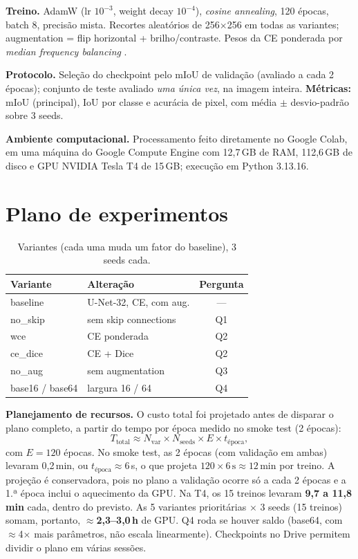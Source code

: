 \documentclass[10pt,a4paper,twocolumn]{article}
\begin{document}
\textbf{Treino.} AdamW (lr $10^{-3}$, weight decay $10^{-4}$), \emph{cosine annealing},
120 épocas, batch 8, precisão mista. Recortes aleatórios de 256$\times$256 em todas as
variantes; augmentation = flip horizontal + brilho/contraste. Pesos da CE ponderada por
\emph{median frequency balancing} \cite{eigen}.

\textbf{Protocolo.} Seleção do checkpoint pelo mIoU de validação (avaliado a cada 2
épocas); conjunto de teste avaliado \emph{uma única vez}, na imagem inteira.
\textbf{Métricas:} mIoU (principal), IoU por classe e acurácia de pixel, com
média $\pm$ desvio-padrão sobre 3 seeds.

\textbf{Ambiente computacional.} Processamento feito diretamente no Google Colab,
em uma máquina do Google Compute Engine com 12,7\,GB de RAM, 112,6\,GB de disco e
GPU NVIDIA Tesla T4 de 15\,GB; execução em Python 3.13.16.

\section{Plano de experimentos}
\begin{table}[h]
\centering\small
\caption{Variantes (cada uma muda um fator do baseline), 3 seeds cada.}
\label{tab:plano}
\begin{tabular}{llc}
\toprule
Variante & Alteração & Pergunta \\
\midrule
baseline & U-Net-32, CE, com aug. & --- \\
no\_skip & sem skip connections & Q1 \\
wce & CE ponderada & Q2 \\
ce\_dice & CE + Dice & Q2 \\
no\_aug & sem augmentation & Q3 \\
base16 / base64 & largura 16 / 64 & Q4 \\
\bottomrule
\end{tabular}
\end{table}

\textbf{Planejamento de recursos.} O custo total foi projetado antes de disparar o
plano completo, a partir do tempo por época medido no smoke test (2 épocas):
\[
T_{\text{total}} \approx N_{\text{var}} \times N_{\text{seeds}} \times E \times t_{\text{época}},
\]
com $E=120$ épocas. No smoke test, as 2 épocas (com validação em ambas) levaram
0,2\,min, ou $t_{\text{época}}\approx6$\,s, o que projeta
$120\times6\,\text{s}\approx12$\,min por treino. A projeção é conservadora, pois no
plano a validação ocorre só a cada 2 épocas e a 1.ª época inclui o aquecimento da GPU.
Na T4, os 15 treinos levaram \textbf{9,7 a 11,8 min} cada, dentro do previsto. As 5 variantes prioritárias
$\times$ 3 seeds (15 treinos) somam, portanto, \textbf{$\approx$2,3--3,0\,h} de GPU.
Q4 roda se houver saldo (base64, com $\approx$4$\times$ mais parâmetros, não escala
linearmente). Checkpoints no Drive permitem dividir o plano em várias sessões.
\end{document}
